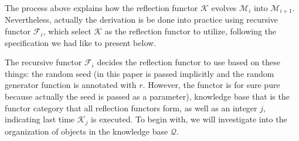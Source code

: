 \documentclass{article}
\begin{document}
The process above explains how the reflection functor \(\mathcal{K}\) evolves \(\mathcal{M}_i\) into \(\mathcal{M}_{i+1}\). Nevertheless, actually the derivation is be done into practice using recursive functor \(\mathcal{F}_i\), which select \(\mathcal{K}\) as the reflection functor to utilize, following the specification we had like to present below.

The recursive functor \(\mathcal{F}_i\) decides the reflection functor to use based on these things: the random seed (in this paper is passed implicitly and the random generator function is annotated with \(\mathit{r}\). However, the functor is for sure pure because actually the seed is passed as a parameter), knowledge base that is the functor category that all reflection functors form, as well as an integer \(j\), indicating last time \(\mathcal{K}_j\) is executed. To begin with, we will investigate into the organization of objects in the knowledge base \(\mathcal{Q}\).
\end{document}
